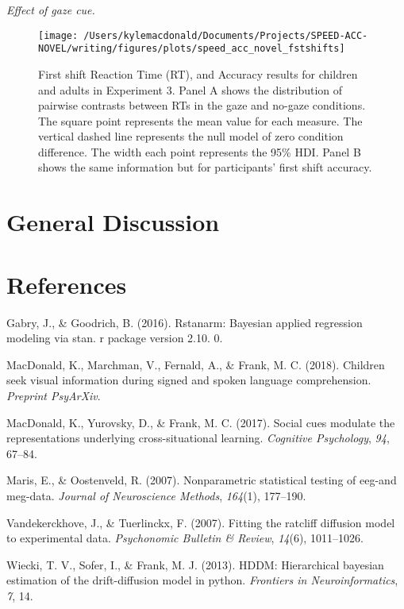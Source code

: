 \documentclass[man,floatsintext]{apa6}
\begin{document}
\emph{Effect of gaze cue.}

\begin{figure}[!t]

{\centering \texttt{[image: /Users/kylemacdonald/Documents/Projects/SPEED-ACC-NOVEL/writing/figures/plots/speed\_acc\_novel\_fstshifts]} 

}

\caption{First shift Reaction Time (RT), and Accuracy results for children and adults in Experiment 3. Panel A shows the distribution of pairwise contrasts between RTs in the gaze and no-gaze conditions. The square point represents the mean value for each measure. The vertical dashed line represents the null model of zero condition difference. The width each point represents the 95\% HDI. Panel B shows the same information but for participants' first shift accuracy.}\label{fig:speed-acc-novel-shifts}
\end{figure}

\section{General Discussion}\label{general-discussion}

\newpage

\section{References}\label{references}

\begingroup
\setlength{\parindent}{-0.5in} \setlength{\leftskip}{0.5in}

\hypertarget{refs}{}
\hypertarget{ref-gabry2016rstanarm}{}
Gabry, J., \& Goodrich, B. (2016). Rstanarm: Bayesian applied regression
modeling via stan. r package version 2.10. 0.

\hypertarget{ref-macdonald2018speed}{}
MacDonald, K., Marchman, V., Fernald, A., \& Frank, M. C. (2018).
Children seek visual information during signed and spoken language
comprehension. \emph{Preprint PsyArXiv}.

\hypertarget{ref-macdonald2017social}{}
MacDonald, K., Yurovsky, D., \& Frank, M. C. (2017). Social cues
modulate the representations underlying cross-situational learning.
\emph{Cognitive Psychology}, \emph{94}, 67--84.

\hypertarget{ref-maris2007nonparametric}{}
Maris, E., \& Oostenveld, R. (2007). Nonparametric statistical testing
of eeg-and meg-data. \emph{Journal of Neuroscience Methods},
\emph{164}(1), 177--190.

\hypertarget{ref-vandekerckhove2007fitting}{}
Vandekerckhove, J., \& Tuerlinckx, F. (2007). Fitting the ratcliff
diffusion model to experimental data. \emph{Psychonomic Bulletin \&
Review}, \emph{14}(6), 1011--1026.

\hypertarget{ref-wiecki2013hddm}{}
Wiecki, T. V., Sofer, I., \& Frank, M. J. (2013). HDDM: Hierarchical
bayesian estimation of the drift-diffusion model in python.
\emph{Frontiers in Neuroinformatics}, \emph{7}, 14.

\endgroup
\end{document}
